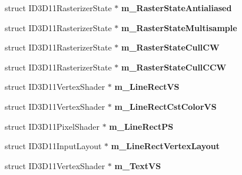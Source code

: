 \begin{DoxyCompactItemize}
\item 
\hypertarget{class_c_tw_graph_direct3_d11_a8acbc921112b24476ce7cf8f251c2821}{struct I\+D3\+D11\+Rasterizer\+State $\ast$ {\bfseries m\+\_\+\+Raster\+State\+Antialiased}}\label{class_c_tw_graph_direct3_d11_a8acbc921112b24476ce7cf8f251c2821}

\item 
\hypertarget{class_c_tw_graph_direct3_d11_a683b33db9f7103e4ddbb6012bbb72581}{struct I\+D3\+D11\+Rasterizer\+State $\ast$ {\bfseries m\+\_\+\+Raster\+State\+Multisample}}\label{class_c_tw_graph_direct3_d11_a683b33db9f7103e4ddbb6012bbb72581}

\item 
\hypertarget{class_c_tw_graph_direct3_d11_a0bf7fdbe550a88008b65efb06f03ff95}{struct I\+D3\+D11\+Rasterizer\+State $\ast$ {\bfseries m\+\_\+\+Raster\+State\+Cull\+C\+W}}\label{class_c_tw_graph_direct3_d11_a0bf7fdbe550a88008b65efb06f03ff95}

\item 
\hypertarget{class_c_tw_graph_direct3_d11_a5eaf073febcbea08961f9e52594410b9}{struct I\+D3\+D11\+Rasterizer\+State $\ast$ {\bfseries m\+\_\+\+Raster\+State\+Cull\+C\+C\+W}}\label{class_c_tw_graph_direct3_d11_a5eaf073febcbea08961f9e52594410b9}

\item 
\hypertarget{class_c_tw_graph_direct3_d11_a4cdba85ab633a336ff907439f76e87ab}{struct I\+D3\+D11\+Vertex\+Shader $\ast$ {\bfseries m\+\_\+\+Line\+Rect\+V\+S}}\label{class_c_tw_graph_direct3_d11_a4cdba85ab633a336ff907439f76e87ab}

\item 
\hypertarget{class_c_tw_graph_direct3_d11_a0c5c250b70d693c063447869977582a3}{struct I\+D3\+D11\+Vertex\+Shader $\ast$ {\bfseries m\+\_\+\+Line\+Rect\+Cst\+Color\+V\+S}}\label{class_c_tw_graph_direct3_d11_a0c5c250b70d693c063447869977582a3}

\item 
\hypertarget{class_c_tw_graph_direct3_d11_ae12054e607a3b7cb212eaa1ded26ea83}{struct I\+D3\+D11\+Pixel\+Shader $\ast$ {\bfseries m\+\_\+\+Line\+Rect\+P\+S}}\label{class_c_tw_graph_direct3_d11_ae12054e607a3b7cb212eaa1ded26ea83}

\item 
\hypertarget{class_c_tw_graph_direct3_d11_aaef550b1219411ef954b6f96ca510573}{struct I\+D3\+D11\+Input\+Layout $\ast$ {\bfseries m\+\_\+\+Line\+Rect\+Vertex\+Layout}}\label{class_c_tw_graph_direct3_d11_aaef550b1219411ef954b6f96ca510573}

\item 
\hypertarget{class_c_tw_graph_direct3_d11_a3bfe9a76be93c2df41d4e54bd614d43b}{struct I\+D3\+D11\+Vertex\+Shader $\ast$ {\bfseries m\+\_\+\+Text\+V\+S}}\label{class_c_tw_graph_direct3_d11_a3bfe9a76be93c2df41d4e54bd614d43b}


\end{DoxyCompactItemize}
